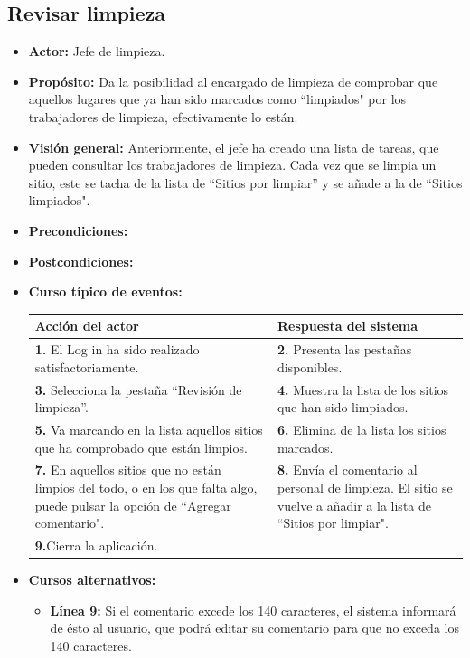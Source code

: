 \documentclass[spanish,a4paper,11pt, twoside]{report}	%
\begin{document}

\subsection{Revisar limpieza}
			\begin{itemize}
			\item \textbf{Actor: }Jefe de limpieza.
			\item \textbf{Propósito: }Da la posibilidad al encargado de limpieza de comprobar que aquellos lugares que ya han sido marcados como “limpiados"  por los trabajadores de limpieza, efectivamente lo están.  		
			\item \textbf{Visión general: }Anteriormente, el jefe ha creado una lista de tareas, que pueden consultar los trabajadores de limpieza. Cada vez que se limpia un sitio, este se tacha de la lista de “Sitios por limpiar'' y se añade a la de “Sitios limpiados".  
			\item \textbf{Precondiciones:} 
			\item \textbf{Postcondiciones:} 
			\item \textbf{Curso típico de eventos:}\\ 
\begin{tabular}{|p{6cm}||p{6cm}|}
				\hline
				\textbf{Acción del actor} & \textbf{Respuesta del sistema} \\ \hline \hline
				\textbf{1.} El Log in ha sido realizado satisfactoriamente. & \textbf{2.} Presenta las pestañas disponibles.\\ \hline
				\textbf{3.} Selecciona la pestaña “Revisión de limpieza”. & \textbf{4.} Muestra la lista de los sitios que han sido limpiados. \\ \hline
				\textbf{5.} Va marcando en la lista aquellos sitios que ha comprobado que están limpios.	& \textbf{6.} Elimina de la lista los sitios marcados. \\ \hline
				\textbf{7.} En aquellos sitios que no están limpios del todo, o en los que falta algo, puede pulsar la opción de “Agregar comentario". & \textbf{8.} Envía el comentario al personal de limpieza. El sitio se vuelve a añadir a la lista de “Sitios por limpiar".\\ \hline
				\textbf{9.}Cierra la aplicación. & \textbf{} \\ \hline
			\end{tabular}
			\item \textbf{Cursos alternativos:} 
				\begin{itemize}
					\item \textbf{Línea 9: }Si el comentario excede los 140 caracteres, el sistema informará de ésto al usuario, que podrá editar su comentario para que no exceda los 140 caracteres.
				\end{itemize}
		\end {itemize}
\end{document}
